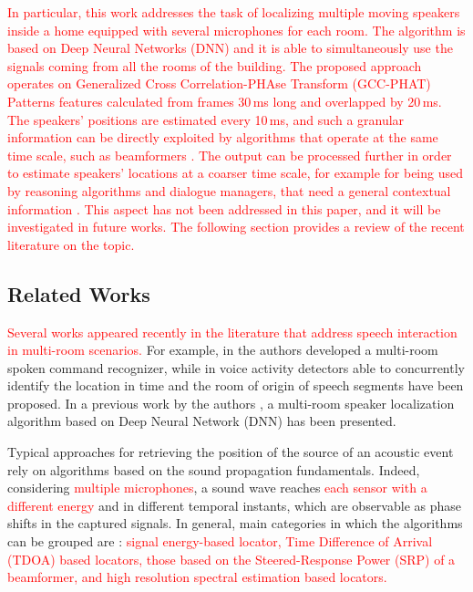 \documentclass[review]{elsarticle}
\begin{document}
\textcolor{red}{In particular, this work addresses the task of localizing multiple moving speakers inside a home equipped with several microphones for each room. The algorithm is based on Deep Neural Networks (DNN) and it is able to simultaneously use the signals coming from all the rooms of the building. The proposed approach operates on Generalized Cross Correlation-PHAse Transform (GCC-PHAT) Patterns \cite{xiao2015learning} features calculated from frames 30\,ms long and overlapped by 20\,ms. The speakers' positions are estimated every 10\,ms, and such a granular information can be directly exploited by algorithms that operate at the same time scale, such as beamformers \cite{Wolfel2009}. The output can be processed further in order to estimate speakers' locations at a coarser time scale, for example for being used by reasoning algorithms and dialogue managers, that need a general contextual information \cite{Augusto2013}. This aspect has not been addressed in this paper, and it will be investigated in future works. The following section provides a review of the recent literature on the topic.
}



\subsection{Related Works}
\textcolor{red}{Several works appeared recently in the literature that address speech interaction in multi-room scenarios.}  For example, in \cite{Rodomagoulakis2017} the authors developed a multi-room spoken command recognizer, while in \cite{ijcnn-vad,vesperini2016deep,Giannoulis2015,Katsamanis2014} voice activity detectors able to concurrently identify the location in time and the room of origin of speech segments have been proposed. In a previous work by the authors \cite{vesperini2016sloc}, a multi-room speaker localization algorithm based on Deep Neural Network (DNN) has been presented.

Typical approaches for retrieving the position of the source of an acoustic event rely on algorithms based on the 
sound propagation fundamentals. Indeed, considering \textcolor{red}{multiple microphones}, a sound wave reaches \textcolor{red}{each sensor with a different energy} and in different temporal instants, which are observable as phase shifts in the captured signals.  %
In general, main categories in which the algorithms can be grouped are \cite{Cobos2017,Meng2017,Dibiase2001Robust}: \textcolor{red}{signal energy-based locator, Time Difference of Arrival (TDOA) based locators, those based on the Steered-Response Power (SRP) of a beamformer, and high resolution spectral estimation based locators. }
\end{document}
